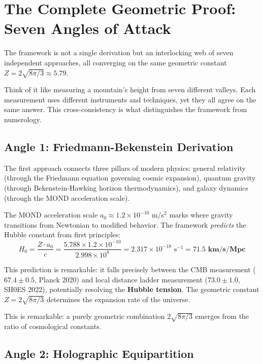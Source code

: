 \documentclass[11pt,a4paper]{article}
\theoremstyle{plain}
\theoremstyle{definition}
\theoremstyle{remark}
\begin{document}
\section{The Complete Geometric Proof: Seven Angles of Attack}

The framework is not a single derivation but an interlocking web of seven independent approaches, all converging on the same geometric constant $Z = 2\sqrt{8\pi/3} \approx 5.79$.

Think of it like measuring a mountain's height from seven different valleys. Each measurement uses different instruments and techniques, yet they all agree on the same answer. This cross-consistency is what distinguishes the framework from numerology.

\subsection{Angle 1: Friedmann-Bekenstein Derivation}

The first approach connects three pillars of modern physics: general relativity (through the Friedmann equation governing cosmic expansion), quantum gravity (through Bekenstein-Hawking horizon thermodynamics), and galaxy dynamics (through the MOND acceleration scale).

The MOND acceleration scale $a_0 \approx 1.2 \times 10^{-10}$ m/s$^2$ marks where gravity transitions from Newtonian to modified behavior. The framework \emph{predicts} the Hubble constant from first principles:
\[
H_0 = \frac{Z \cdot a_0}{c} = \frac{5.788 \times 1.2 \times 10^{-10}}{2.998 \times 10^8} = 2.317 \times 10^{-18} \text{ s}^{-1} = \mathbf{71.5 \text{ km/s/Mpc}}
\]

This prediction is remarkable: it falls precisely between the CMB measurement ($67.4 \pm 0.5$, Planck 2020) and local distance ladder measurement ($73.0 \pm 1.0$, SH0ES 2022), potentially resolving the \textbf{Hubble tension}. The geometric constant $Z = 2\sqrt{8\pi/3}$ determines the expansion rate of the universe.

This is remarkable: a purely geometric combination $2\sqrt{8\pi/3}$ emerges from the ratio of cosmological constants.

\subsection{Angle 2: Holographic Equipartition}
\end{document}
